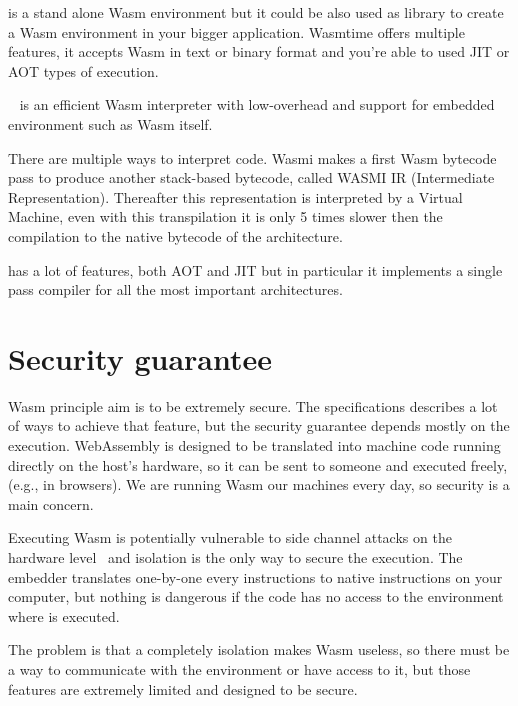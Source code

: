\begin{description}[font=$\bullet$ \scshape\bfseries]
  \item[Wasmtime]
        is a stand alone Wasm environment but it could be also used as library to create a Wasm environment in your bigger application. Wasmtime offers multiple features, it accepts Wasm in text or binary format and you're able to used JIT or AOT types of execution.
  \item[Wasmi]
        ~\cite{wasmi} is an efficient Wasm interpreter with low-overhead and support for embedded environment such as Wasm itself.

        There are multiple ways to interpret code. Wasmi makes a first Wasm bytecode pass to produce another stack-based bytecode, called WASMI IR (Intermediate Representation). Thereafter this representation is interpreted by a Virtual Machine, even with this transpilation it is only 5 times slower then the compilation to the native bytecode of the architecture.

        \item[Wasmer] has a lot of features, both AOT and JIT but in particular it implements a single pass compiler for all the most important architectures.
\end{description}

\section{Security guarantee}

Wasm principle aim is to be extremely secure. The specifications describes a lot of ways to achieve that feature, but the security guarantee depends mostly on the execution. WebAssembly is designed to be translated into machine code running directly on the host’s hardware, so it can be sent to someone and executed freely, (e.g., in browsers). We are running Wasm our machines every day, so security is a main concern.

Executing Wasm is potentially vulnerable to side channel attacks on the hardware level~\cite{wasm-core-spec} and isolation is the only way to secure the execution.  The embedder translates one-by-one every instructions to native instructions on your computer, but nothing is dangerous if the code has no access to the environment where is executed.

The problem is that a completely isolation makes Wasm useless, so there must be a way to communicate with the environment or  have access to it, but those features are extremely limited and designed to be secure.

